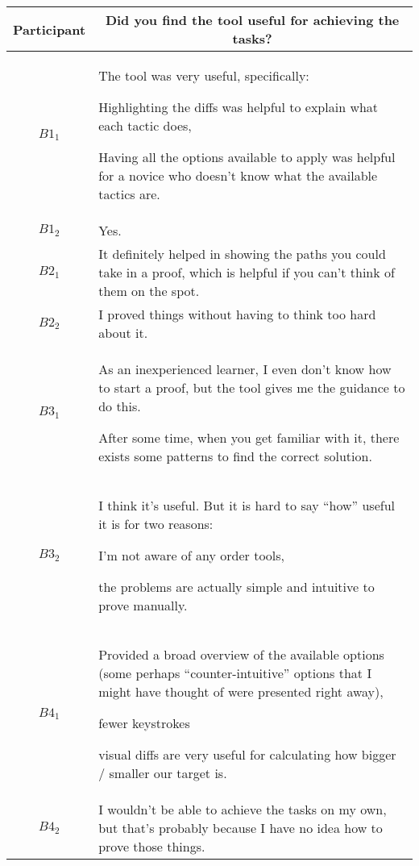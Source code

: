 \noindent
\begin{tabularx}{\linewidth}{@{}cX@{}}
  \toprule
  Participant & \multicolumn{1}{c}{
    \textbf{Did you find the tool useful for achieving the tasks?}
  } \\ \midrule
  $B1_{1}$ & The tool was very useful, specifically: \begin{enumerate*} \item Highlighting the diffs was helpful to explain what each tactic does, \item Having all the options available to apply was helpful for a novice who doesn't know what the available tactics are. \end{enumerate*} \\
  $B1_{2}$ & Yes. \\
  $B2_{1}$ & It definitely helped in showing the paths you could take in a proof, which is helpful if you can't think of them on the spot. \\
  $B2_{2}$ & I proved things without having to think too hard about it. \\
  $B3_{1}$ & \begin{enumerate*} \item As an inexperienced learner, I even don't know how to start a proof, but the tool gives me the guidance to do this. \item After some time, when you get familiar with it, there exists some patterns to find the correct solution. \end{enumerate*} \\
  $B3_{2}$ & I think it's useful.  But it is hard to say ``how'' useful it is for two reasons: \begin{enumerate*} \item I'm not aware of any order tools, \item the problems are actually simple and intuitive to prove manually. \end{enumerate*} \\
  $B4_{1}$ & \begin{enumerate*} \item Provided a broad overview of the available options (some perhaps ``counter-intuitive'' options that I might have thought of were presented right away), \item fewer keystrokes \item visual diffs are very useful for calculating how bigger / smaller our target is. \end{enumerate*} \\
  $B4_{2}$ & I wouldn't be able to achieve the tasks on my own, but that's probably because I have no idea how to prove those things. \\

\end{tabularx}
